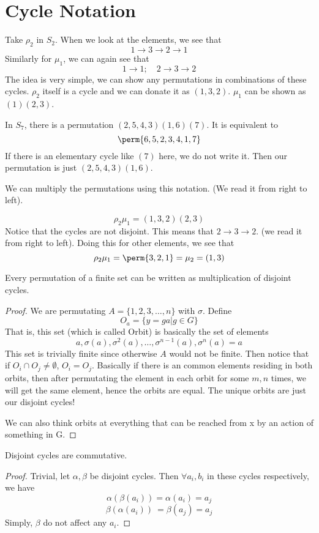 \section{Cycle Notation}
Take $\rho_2$ in $S_2$. When we look at the elements, we see that
\[ 1 \rightarrow 3 \rightarrow 2 \rightarrow 1\]
Similarly for $\mu_1$, we can again see that
\[ 1 \rightarrow 1; \quad 2 \rightarrow 3 \rightarrow 2\]
The idea is very simple, we can show any permutations in combinations of these cycles. $\rho_2$ itself is a cycle and we can donate it as
$(1,3,2)$. $\mu_1$ can be shown as $(1)(2,3)$.
\begin{example}
    In $S_7$, there is a permutation $(2,5,4,3)(1,6)(7)$. It is equivalent to
    \[ \perm{6,5,2,3,4,1,7}\]
    If there is an elementary cycle like $(7)$ here, we do not write it. Then our permutation is just $(2,5,4,3)(1,6)$.
\end{example}
We can multiply the permutations using this notation. (We read it from right to left).
\begin{example}
    \[ \rho_2 \mu_1 = (1,3,2)(2,3)\]
    Notice that the cycles are not \alert{disjoint}.
    This means that $2 \rightarrow 3 \rightarrow 2$. (we read it from right to left). Doing this for other elements, we see that
    \[ \rho_2 \mu_1 = \perm{3,2,1} = \mu_2 = (1,3)\]
\end{example}
\begin{theorem}
    Every permutation of a finite set can be written as multiplication of disjoint cycles.
    \begin{proof}
        We are permutating $A = \{ 1,2,3, \ldots, n \}$ with $\sigma$. Define \[ O_a = \{ y  = ga | g \in G \} \]
        That is, this set (which is called \alert{Orbit}) is basically the set of elements \[a, \sigma(a), \sigma^2(a),
            \ldots, \sigma^{n-1}
        (a), \sigma^n (a) = a\]
        This set is trivially finite since otherwise $A$ would not be finite. Then notice that if $O_i \cap O_j \neq \emptyset$, $O_i =
        O_j$. Basically if there is an common elements residing in both orbits, then after permutating the element in each orbit for some
        $m,n$ times, we will get the same element, hence the orbits are equal. The unique orbits are just our disjoint cycles!

        We can also think orbits at everything that can be reached from x by an action of something in G.
    \end{proof}
\end{theorem}
\begin{theorem} Disjoint cycles are commutative.
    \begin{proof}
        Trivial, let $\alpha, \beta$ be disjoint cycles. Then $\forall a_i, b_i$ in these cycles respectively, we have
        \[ \alpha(\beta(a_i)) = \alpha(a_i) = a_j\]
        \[ \beta(\alpha(a_i))\ = \beta(a_j) = a_j\]
        Simply, $\beta$ do not affect any $a_i$.
    \end{proof}
\end{theorem}

